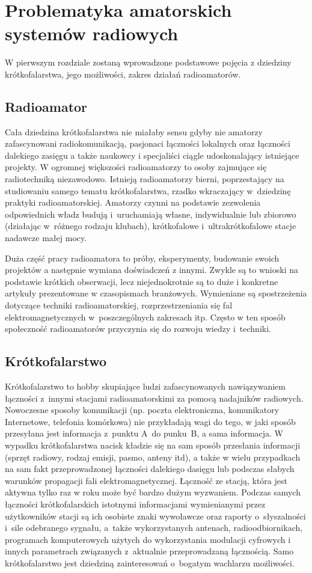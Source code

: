 \documentclass[]{mgr}
\begin{document}
    \chapter{Problematyka amatorskich systemów radiowych}
    \label{sec:teoretical_description}
    W pierwszym rozdziale zostaną wprowadzone podstawowe pojęcia z dziedziny krótkofalarstwa, jego możliwości, zakres działań radioamatorów.

        \section{Radioamator}
        Cała dziedzina krótkofalarstwa nie miałaby sensu gdyby nie amatorzy zafascynowani radiokomunikacją, pasjonaci łączności lokalnych oraz łączności dalekiego zasięgu a także naukowcy i specjaliści ciągle udoskonalający istniejące projekty. W ogromnej większości radioamatorzy to osoby zajmujące się radiotechniką niezawodowo. Istnieją radioamatorzy bierni, poprzestający na studiowaniu samego tematu krótkofalarstwa, rzadko wkraczający w~dziedzinę praktyki radioamatorskiej. Amatorzy czynni na podstawie zezwolenia odpowiednich władz budują i~uruchamiają własne, indywidualnie lub zbiorowo (działając w~różnego rodzaju klubach), krótkofalowe i~ultrakrótkofalowe stacje nadawcze małej mocy.

        Duża część pracy radioamatora to próby, eksperymenty, budowanie swoich projektów a następnie wymiana doświadczeń z innymi. Zwykle są to wnioski na podstawie krótkich obserwacji, lecz niejednokrotnie są to duże i konkretne artykuły prezentowane w czasopismach branżowych. Wymieniane są spostrzeżenia dotyczące techniki radioamatorskiej, rozprzestrzeniania się fal elektromagnetycznych w~poszczególnych zakresach itp. Często w ten sposób społeczność radioamatorów przyczynia się do rozwoju wiedzy i~techniki. 

        \section{Krótkofalarstwo}
        Krótkofalarstwo to hobby skupiające ludzi zafascynowanych nawiązywaniem łączności z~innymi stacjami radioamatorskimi za pomocą nadajników radiowych. Nowoczesne sposoby komunikacji (np. poczta elektroniczna, komunikatory Internetowe, telefonia komórkowa) nie przykładają wagi do tego, w jaki sposób przesyłana jest informacja z~punktu A~do punku~B, a sama informacja. W wypadku krótkofalarstwa nacisk kładzie się na sam sposób przesłania informacji (sprzęt radiowy, rodzaj emisji, pasmo, anteny itd), a także w wielu przypadkach na sam fakt przeprowadzonej łączności dalekiego dasięgu lub podsczas słabych warunków propagacji fali elektromagnetycznej. Łączność ze stacją, która jest aktywna tylko raz w roku może być bardzo dużym wyzwaniem. Podczas samych łączności krótkofalarskich istotnymi informacjami wymienianymi przez użytkowników stacji są ich osobiste znaki wywoławcze oraz raporty o~słyszalności i~sile odebranego sygnału, a~także wykorzystanych antenach, radioodbiornikach, programach komputerowych użytych do wykorzystania modulacji cyfrowych i innych parametrach związanych z~aktualnie przeprowadzaną łącznością. Samo krótkofalarstwo jest dziedziną zainteresowań o~bogatym wachlarzu możliwości.
\end{document}
